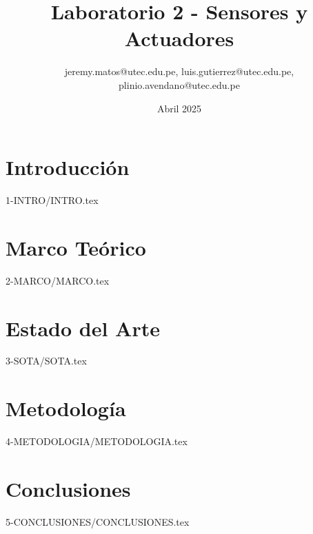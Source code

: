 \documentclass{report}
\title{Laboratorio 2 - Sensores y Actuadores}
\author{jeremy.matos@utec.edu.pe, luis.gutierrez@utec.edu.pe, plinio.avendano@utec.edu.pe}
\date{Abril 2025}
\begin{document}
\maketitle

\newpage
\tableofcontents



\chapter{Introducción}
{1-INTRO/INTRO.tex}

\chapter{Marco Teórico}
{2-MARCO/MARCO.tex}

\chapter{Estado del Arte}
{3-SOTA/SOTA.tex}

\chapter{Metodología}
{4-METODOLOGIA/METODOLOGIA.tex}

\chapter{Conclusiones}
{5-CONCLUSIONES/CONCLUSIONES.tex}








\end{document}
